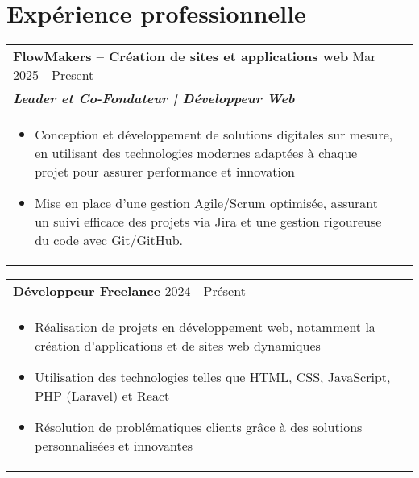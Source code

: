 \documentclass[a4paper,8pt]{article}
\begin{document}
\section{Expérience professionnelle}
\begin{tabularx}{\linewidth}{ @{}l r@{} }
\textbf{{FlowMakers – Création de sites et applications web}} \hfill \color[HTML]{371e77} Mar 2025 - Present \\[4pt]
\color[HTML]{371e77}\textbf{\textit{Leader et Co-Fondateur | Développeur Web}}\ \hfill \color[HTML]{4B28A4} \\[5pt]
\begin{minipage}[t]{\linewidth}
    \begin{itemize}[nosep,after=\strut, leftmargin=2em, itemsep=2pt]
        \item Conception et développement de solutions digitales sur mesure, en utilisant des technologies modernes adaptées à chaque projet pour assurer performance et innovation
        \item  Mise en place d’une gestion Agile/Scrum optimisée, assurant un suivi efficace des projets via Jira et une gestion rigoureuse du code avec Git/GitHub.
    \end{itemize}
\end{minipage}
\end{tabularx}

\begin{tabularx}{\linewidth}{ @{}l r@{} }
\textbf{{Développeur Freelance}} \hfill \color[HTML]{371e77} 2024 - Présent \\[4pt]
\begin{minipage}[t]{\linewidth}
    \begin{itemize}[nosep,after=\strut, leftmargin=2em, itemsep=2pt]
        \item Réalisation de projets en développement web, notamment la création d'applications et de sites web dynamiques
        \item Utilisation des technologies telles que HTML, CSS, JavaScript, PHP (Laravel) et React
        \item Résolution de problématiques clients grâce à des solutions personnalisées et innovantes
    \end{itemize}
\end{minipage}
\end{tabularx}
\end{document}
